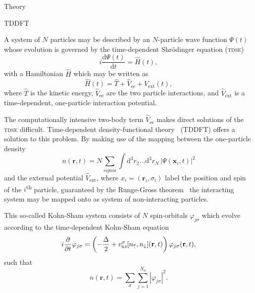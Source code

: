 \documentclass[aps, pra, reprint, groupedaddress, amsfonts,
               amsmath, amssymb, showpacs, nofootinbib]{revtex4-1}
\begin{document}
\begin{section}{Theory \label{sec:theory}}

   \begin{subsection}{TDDFT \label{sec:tddft}}

      A system of $N$ particles may be described by an $N$-particle wave function $\Psi(t)$ whose
      evolution is governed by the time-dependent Shr\"{o}dinger equation (\textsc{tdse})
      \begin{equation} \label{eq:tdse}
         i \frac{\mathrm{d} \Psi(t)}{\mathrm{d}t} = \hat{H}(t),
      \end{equation}
      with a Hamiltonian $\hat{H}$ which may be written as
      \begin{equation} \label{eq:ham}
         \hat{H}(t) = \hat{T} + \hat{V}_\mathrm{ee} + \hat{V}_\mathrm{ext}(t),
      \end{equation}
      where $\hat{T}$ is the kinetic energy, $\hat{V}_\mathrm{ee}$ are the two particle interactions,
      and $\hat{V}_\mathrm{ext}$ is a time-dependent, one-particle interaction potential.

      The computationally intensive two-body term $\hat{V}_\mathrm{ee}$ makes direct solutions of the
      \textsc{tdse} difficult. Time-dependent density-functional theory~\cite{tddft, ullrich} (TDDFT)
      offers a solution to this problem. By making use of the mapping between the one-particle density
      \begin{equation} \label{eq:dendef}
         n(\mathbf{r},t) = N \sum\limits_{sigma} \int \mathrm{d}^3 r_2 \dots \mathrm{d}^3 r_N \,
                            \left| \Psi(\mathbf{x}_i,t) \right|^2
      \end{equation}
      and the external potential $\hat{V}_\mathrm{ext}$, where $x_i = (\mathbf{r}_i, \sigma_i)$ label
      the position and spin of the $i$\textsuperscript{th} particle, guaranteed by the Runge-Gross
      theorem~\cite{rg_theorem, td-spindep} the interacting system may be mapped onto as system of
      non-interacting particles.

      This so-called Kohn-Sham system consists of $N$ spin-orbitals $\varphi_{j \sigma}$ which evolve
      according to the time-dependent Kohn-Sham equation
      \begin{equation} \label{eq:tdks}
         i \frac{\partial}{\partial t} \varphi_{j\sigma} = \left( -\frac{\Delta}{2} +
               v^\sigma_\mathrm{\textsc{ks}}[n_\uparrow, n_\downarrow](\mathbf{r},t)
               \right) \varphi_{j\sigma}(\mathbf{r},t),
      \end{equation}
      such that
      \begin{equation} \label{eq:ksden}
         n(\mathbf{r},t) = \sum\limits_\sigma \sum\limits_{j=1}^{N_\sigma}
                           \left| \varphi_{j\sigma} \right|^2.
      \end{equation}
      

\end{subsection}
\end{section}
\end{document}
